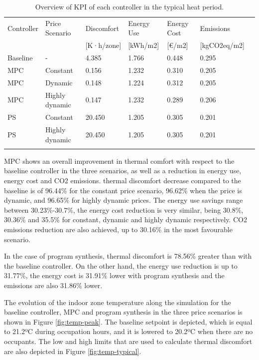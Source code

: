 \begin{table}
    \caption{Overview of KPI of each controller in the typical heat period.}
    \label{tab:3}
    
    \centering
    \begin{tabular}{lllllll}
        \hline
        \noalign{\smallskip}
        Controller & Price Scenario & Discomfort & Energy Use & Energy Cost & Emissions  \\
        & & [K·h/zone] & [kWh/m2] & [€/m2] & [kgCO2eq/m2] \\
        \noalign{\smallskip}
        \hline
        \noalign{\smallskip}
        Baseline & - & 4.385 & 1.766 & 0.448 & 0.295 \\
        MPC & Constant & 0.156 & 1.232 & 0.310 & 0.205 \\
        MPC & Dynamic & 0.148 & 1.224 & 0.312 & 0.205 \\
        MPC & Highly dynamic & 0.147 & 1.232 & 0.289 & 0.206 \\
        PS & Constant & 20.450 & 1.205 & 0.305 & 0.201 \\
        PS & Highly dynamic & 20.450 & 1.205 & 0.305 & 0.201 \\
        \noalign{\smallskip}
        \hline
    \end{tabular}
\end{table}

MPC shows an overall improvement in thermal comfort with respect to the baseline controller in the three scenarios, as well as a reduction in energy use, energy cost and CO2 emissions. thermal discomfort decrease compared to the baseline is of 96.44\% for the constant price scenario, 96.62\% when the price is dynamic, and 96.65\% for highly dynamic prices. The energy use savings range between 30.23\%-30.7\%, the energy cost reduction is very similar, being 30.8\%, 30.36\% and 35.5\% for constant, dynamic and highly dynamic respectively. CO2 emissions reduction are also achieved, up to 30.16\% in the most favourable scenario.

In the case of program synthesis, thermal discomfort is 78.56\% greater than with the baseline controller. On the other hand, the energy use reduction is up to 31.77\%, the energy cost is 31.91\% lower with program synthesis and the emissions are also 31.86\% lower.

The evolution of the indoor zone temperature along the simulation for the baseline controller, MPC and program synthesis in the three price scenarios is shown in Figure \ref{fig:temp-peak}. The baseline setpoint is depicted, which is equal to 21.2ºC during occupation hours, and it is lowered to 20.2ºC when there are no occupants. The low and high limits that are used to calculate thermal discomfort are also depicted in Figure \ref{fig:temp-typical}.

